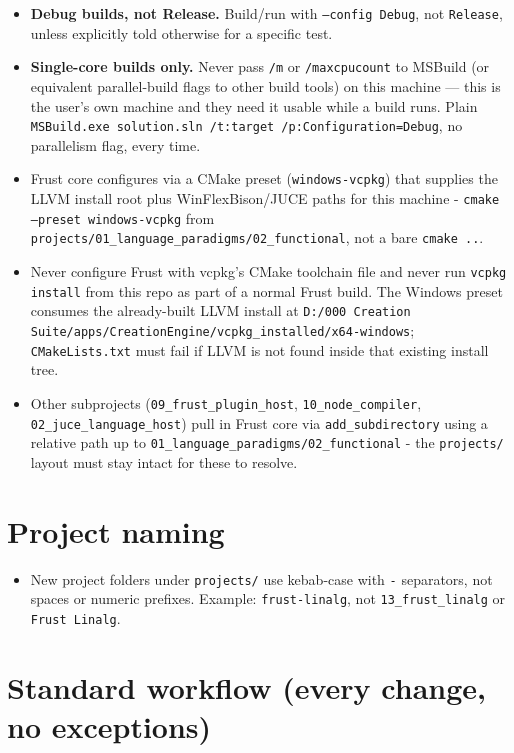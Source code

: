 \documentclass{book}
\begin{document}
\begin{itemize}
\item \textbf{Debug builds, not Release.} Build/run with \texttt{--config Debug}, not \texttt{Release}, unless explicitly told otherwise for a specific test.
\item \textbf{Single-core builds only.} Never pass \texttt{/m} or \texttt{/maxcpucount} to MSBuild (or equivalent parallel-build flags to other build tools) on this machine — this is the user's own machine and they need it usable while a build runs. Plain \texttt{MSBuild.exe solution.sln /t:target /p:Configuration=Debug}, no parallelism flag, every time.
\item Frust core configures via a CMake preset (\texttt{windows-vcpkg}) that supplies the LLVM install root plus WinFlexBison/JUCE paths for this machine - \texttt{cmake --preset windows-vcpkg} from \texttt{projects/01_language_paradigms/02_functional}, not a bare \texttt{cmake ..}.
\item Never configure Frust with vcpkg's CMake toolchain file and never run \texttt{vcpkg install} from this repo as part of a normal Frust build. The Windows preset consumes the already-built LLVM install at \texttt{D:/000 Creation Suite/apps/CreationEngine/vcpkg_installed/x64-windows}; \texttt{CMakeLists.txt} must fail if LLVM is not found inside that existing install tree.
\item Other subprojects (\texttt{09_frust_plugin_host}, \texttt{10_node_compiler}, \texttt{02_juce_language_host}) pull in Frust core via \texttt{add_subdirectory} using a relative path up to \texttt{01_language_paradigms/02_functional} - the \texttt{projects/} layout must stay intact for these to resolve.
\end{itemize}

\section{Project naming}

\begin{itemize}
\item New project folders under \texttt{projects/} use kebab-case with \texttt{-} separators, not spaces or numeric prefixes. Example: \texttt{frust-linalg}, not \texttt{13_frust_linalg} or \texttt{Frust Linalg}.
\end{itemize}

\section{Standard workflow (every change, no exceptions)}
\end{document}
